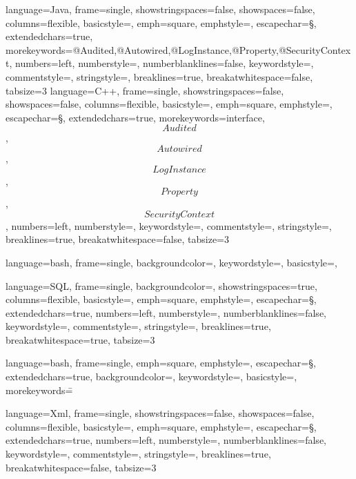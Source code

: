 

{
	language={Java},
	frame={single},
  showstringspaces={false},
	showspaces={false},
  columns={flexible},
  basicstyle={\footnotesize\ttfamily},
	emph={square},
	emphstyle={\color{blue}},
	escapechar={§},
	extendedchars={true},
	morekeywords={@Audited,@Autowired,@LogInstance,@Property,@SecurityContext},
	numbers={left},
  numberstyle={\tiny\color{gray}},
	numberblanklines={false},
  keywordstyle={\color{violet}},
  commentstyle={\color{dkgreen}},
  stringstyle={\color{blue}},
  breaklines={true},
  breakatwhitespace={false},
  tabsize={3}
}
{
	language={C++},
	frame={single},
  showstringspaces={false},
	showspaces={false},
  columns={flexible},
  basicstyle={\footnotesize\ttfamily},
	emph={square},
	emphstyle={\color{blue}},
	escapechar={§},
	extendedchars={true},
	morekeywords={interface,\[Audited\],\[Autowired\],\[LogInstance\],\[Property\],\[SecurityContext\]},
	numbers={left},
  numberstyle={\tiny\color{gray}},
  keywordstyle={\color{violet}},
  commentstyle={\color{dkgreen}},
  stringstyle={\color{blue}},
  breaklines={true},
  breakatwhitespace={false},
  tabsize={3}
}

{	language=bash,
	frame=single,
	backgroundcolor=\color{lightgrey},
	keywordstyle=\color{blue},
	basicstyle=\ttfamily,
}

{
	language={SQL},
	frame={single},
	backgroundcolor=\color{lightblue},
  showstringspaces={true},
  columns={flexible},
  basicstyle={\small\ttfamily},
	emph={square},
	emphstyle={\color{blue}},
	escapechar={§},
	extendedchars={true},
	numbers={left},
  numberstyle={\tiny\color{gray}},
	numberblanklines={false},
  keywordstyle={\color{violet}},
  commentstyle={\color{dkgreen}},
  stringstyle={\color{blue}},
  breaklines={true},
  breakatwhitespace={true},
  tabsize={3}
}

{	language=bash,
	frame=single,
	emph={square},
	emphstyle={\color{blue}},
	escapechar={§},
	extendedchars={true},
	backgroundcolor=\color{white},
	keywordstyle=\color{blue},
	basicstyle=\ttfamily,
	morekeywords={\=}
}

{
	language={Xml},
	frame={single},
  showstringspaces={false},
	showspaces={false},
  columns={flexible},
  basicstyle={\footnotesize\ttfamily},
	emph={square},
	emphstyle={\color{blue}},
	escapechar={§},
	extendedchars={true},
	numbers={left},
  numberstyle={\tiny\color{gray}},
	numberblanklines={false},
  keywordstyle={\color{violet}},
  commentstyle={\color{dkgreen}},
  stringstyle={\color{blue}},
  breaklines={true},
  breakatwhitespace={false},
  tabsize={3}
}